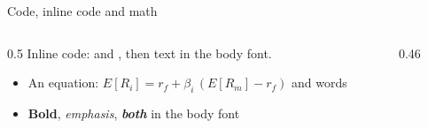 \begin{standardframe}{Code, inline code and math}
	\begin{columns}[T,onlytextwidth]
		\begin{column}{0.5\linewidth}
			Inline code:  and , then text in the body font.
			\begin{itemize}
				\item An equation: $E[R_i]=r_f+\beta_i\,(E[R_m]-r_f)$ and  words
				\item \textbf{Bold}, \emph{emphasis}, \textbf{\emph{both}} in the body font
			\end{itemize}
		\end{column}
		\begin{column}{0.46\linewidth}
		\end{column}
	\end{columns}
\end{standardframe}

